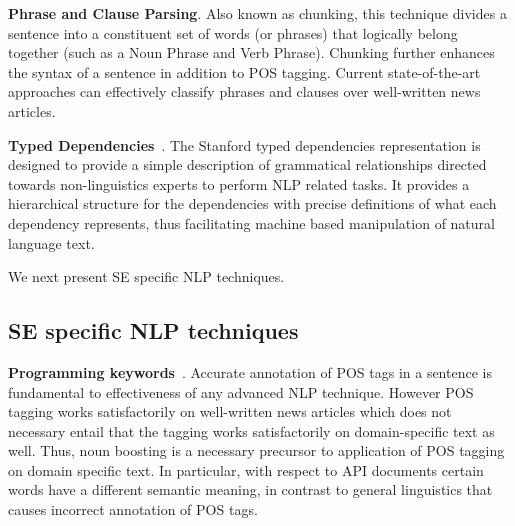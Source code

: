 \textbf{Phrase and Clause Parsing}. Also known as chunking, this technique divides a sentence into a constituent set of words (or phrases) that logically belong together (such as a Noun Phrase and Verb Phrase). Chunking further enhances the syntax of a sentence in addition to POS tagging. Current state-of-the-art approaches can effectively classify phrases and clauses over well-written news articles.

\textbf{Typed Dependencies}~\cite{Marneffe06LREC,Marneffe08COLING}. The Stanford typed dependencies representation  is designed to provide a simple description of grammatical relationships directed towards non-linguistics experts to perform NLP related tasks. It provides a hierarchical structure for the dependencies with precise definitions of what each dependency represents, thus facilitating machine based manipulation of natural language text.



We next present SE specific NLP techniques.

\subsection{SE specific NLP techniques}
\label{sub:SENLPback}

\textbf{Programming keywords}~\cite{pandita12:inferring}. Accurate annotation of POS tags in a sentence is fundamental to effectiveness of any advanced NLP technique.
However POS tagging works satisfactorily on well-written news articles which does not necessary entail that the tagging works satisfactorily on domain-specific text as well.
Thus, noun boosting is a necessary precursor to application of POS tagging on domain specific text.
In particular, with respect to API documents certain words have a different semantic meaning, in contrast to general linguistics that causes incorrect annotation of POS tags.

